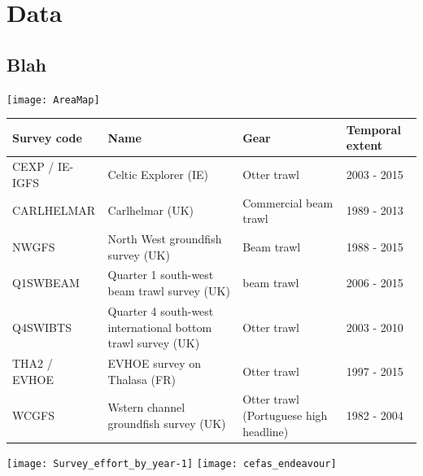 \documentclass[xcolor=x11names,compress]{beamer}
\renewcommand{\(}{\begin{columns}}
\renewcommand{\)}{\end{columns}}
\newcommand{\<}[1]{\begin{column}{#1}}
\renewcommand{\>}{\end{column}}
\begin{document}






	


\section{Data}
\subsection{Blah}

\begin{frame}{}
\centering
\texttt{[image: AreaMap]}

\end{frame}

\begin{frame}

\begin{table}[!htb]
	\tiny
	\center
	\begin{tabular}{ p{1.5cm} p{3cm} p{2cm} p{1.5cm} }
		\hline
		Survey code    & Name 	& Gear & Temporal extent \\
		\hline
		CEXP / IE-IGFS & Celtic Explorer (IE)   & Otter trawl & 2003 - 2015 \\
		CARLHELMAR     & Carlhelmar (UK)	& Commercial beam trawl & 1989 - 2013 \\
		NWGFS          & North West groundfish survey (UK) & Beam trawl & 1988 - 2015 \\
		Q1SWBEAM       & Quarter 1 south-west beam trawl survey (UK) 	& beam trawl & 2006 - 2015 \\
		Q4SWIBTS       & Quarter 4 south-west international bottom trawl survey (UK) & Otter trawl & 2003 - 2010 \\
		THA2 / EVHOE    & EVHOE survey on Thalasa (FR) & Otter trawl & 1997 - 2015 \\
		WCGFS          & Wstern channel groundfish survey (UK) & Otter
		trawl (Portuguese high headline) & 1982 - 2004 \\
		\hline
	\end{tabular}
	
\end{table}

\texttt{[image: Survey\_effort\_by\_year-1]}
\texttt{[image: cefas\_endeavour]}

\end{frame}
\end{document}
